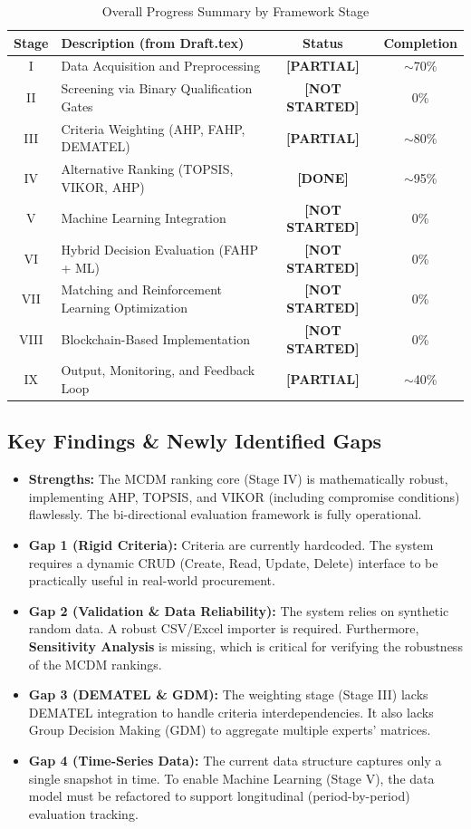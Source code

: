 \documentclass[11pt]{article}
\newcommand{\done}{\textcolor{done}{\textbf{[DONE]}}}
\newcommand{\partial}{\textcolor{partial}{\textbf{[PARTIAL]}}}
\newcommand{\notdone}{\textcolor{notdone}{\textbf{[NOT STARTED]}}}
\begin{document}
\begin{table}[H]
\centering
\caption{Overall Progress Summary by Framework Stage}
\label{tab:executive-summary}
\small
\begin{tabularx}{\textwidth}{c >{\raggedright\arraybackslash}X c c}
\toprule
\textbf{Stage} & \textbf{Description (from Draft.tex)} & \textbf{Status} & \textbf{Completion} \\
\midrule
I & Data Acquisition and Preprocessing & \partial & $\sim$70\% \\
II & Screening via Binary Qualification Gates & \notdone & 0\% \\
III & Criteria Weighting (AHP, FAHP, DEMATEL) & \partial & $\sim$80\% \\
IV & Alternative Ranking (TOPSIS, VIKOR, AHP) & \done & $\sim$95\% \\
V & Machine Learning Integration & \notdone & 0\% \\
VI & Hybrid Decision Evaluation (FAHP + ML) & \notdone & 0\% \\
VII & Matching and Reinforcement Learning Optimization & \notdone & 0\% \\
VIII & Blockchain-Based Implementation & \notdone & 0\% \\
IX & Output, Monitoring, and Feedback Loop & \partial & $\sim$40\% \\
\bottomrule
\end{tabularx}
\end{table}

\subsection{Key Findings \& Newly Identified Gaps}

\begin{itemize}
    \item \textbf{Strengths:} The MCDM ranking core (Stage IV) is mathematically robust, implementing AHP, TOPSIS, and VIKOR (including compromise conditions) flawlessly. The bi-directional evaluation framework is fully operational.
    \item \textbf{Gap 1 (Rigid Criteria):} Criteria are currently hardcoded. The system requires a dynamic CRUD (Create, Read, Update, Delete) interface to be practically useful in real-world procurement.
    \item \textbf{Gap 2 (Validation \& Data Reliability):} The system relies on synthetic random data. A robust CSV/Excel importer is required. Furthermore, \textbf{Sensitivity Analysis} is missing, which is critical for verifying the robustness of the MCDM rankings.
    \item \textbf{Gap 3 (DEMATEL \& GDM):} The weighting stage (Stage III) lacks DEMATEL integration to handle criteria interdependencies. It also lacks Group Decision Making (GDM) to aggregate multiple experts' matrices.
    \item \textbf{Gap 4 (Time-Series Data):} The current data structure captures only a single snapshot in time. To enable Machine Learning (Stage V), the data model must be refactored to support longitudinal (period-by-period) evaluation tracking.
\end{itemize}
\end{document}
